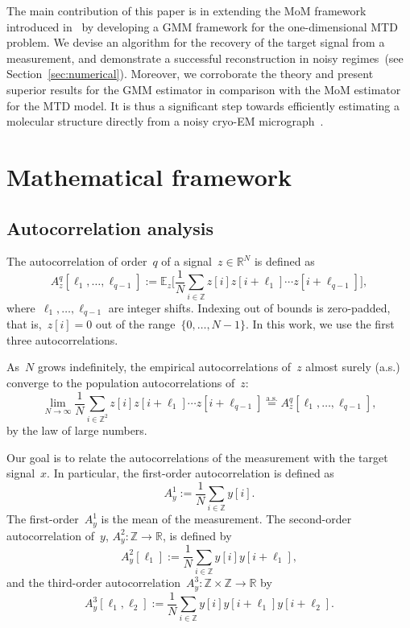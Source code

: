 \documentclass{article}
\begin{document}
The main contribution of this paper is in extending the MoM framework introduced in~\cite{bendory2019multi} by developing a GMM framework for the one-dimensional MTD problem. We devise an algorithm for the recovery of the target signal from a measurement, and demonstrate a successful reconstruction in noisy regimes~(see Section~\ref{sec:numerical}). Moreover, we corroborate the theory and present superior results for the GMM estimator in comparison with the MoM estimator for the MTD model. It is thus a significant step towards efficiently estimating a molecular structure directly from a noisy \mbox{cryo-EM} micrograph~\cite{bendory2018toward}.

\section{Mathematical framework}
\label{sec:math}
\subsection{Autocorrelation analysis}
\label{subsec:ac}
The autocorrelation of order~$q$ of a signal~\mbox{$z \in \mathbb{R}^{N}$} is defined as
\begin{equation}
A_z^q[\ell_1, \ldots, \ell_{q-1}] := \mathbb{E}_z\Big[\frac{1}{N} \sum_{i \in \mathbb{Z}} z[i] z[i + \ell_1] \cdots z[i + \ell_{q-1}]\Big],
\end{equation}
where~$\ell_1, \ldots, \ell_{q-1}$ are integer shifts. Indexing out of bounds is zero-padded, that is,~\mbox{$z[i] = 0$} out of the range~\mbox{$\{0, \ldots, {N-1}\}$}. In this work, we use the first three autocorrelations.

As~$N$ grows indefinitely, the empirical autocorrelations of~$z$ almost surely (a.s.) converge to the population autocorrelations of~$z$:
\begin{equation}
\lim_{N \rightarrow \infty} \frac{1}{N} \sum_{i \in \mathbb{Z}^2} z[i] z[i + \ell_1] \cdots z[i + \ell_{q-1}] \stackrel{\text{a.s.}}{=}A_z^q[\ell_1, \ldots, \ell_{q-1}],
\end{equation}
by the law of large numbers.

Our goal is to relate the autocorrelations of the measurement with the target signal~$x$. In particular, the first-order autocorrelation is defined as
\begin{equation}
A_{y}^1 := \frac{1}{N} \sum_{i \in \mathbb{Z}} y[i].
\end{equation}
The first-order~$A_{y}^1$ is the mean of the measurement. The second-order autocorrelation of~$y$, \mbox{$A_{y}^2: \mathbb{Z} \rightarrow \mathbb{R}$}, is defined by
\begin{equation}
A_{y}^2 [\ell_1] := \frac{1}{N} \sum_{i \in \mathbb{Z}} y[i] y[i + \ell_1],
\end{equation}
and the third-order autocorrelation~\mbox{$A_{y}^3: \mathbb{Z} \times \mathbb{Z} \rightarrow \mathbb{R}$} by
\begin{equation}
A_{y}^3 [\ell_1, \ell_2] := \frac{1}{N} \sum_{i \in \mathbb{Z}} y[i] y[i + \ell_1] y[i + \ell_2].
\end{equation}
\end{document}
